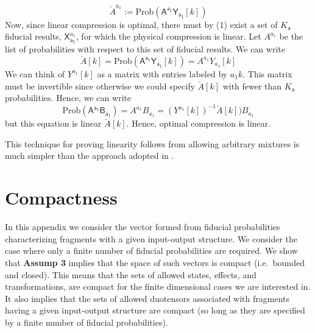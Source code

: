 \documentclass[10pt]{article}
\begin{document}
\begin{equation}
\breve{A}^{a_1}:= \text{Prob}(\mathsf{A^{a_1}}\mathsf{Y}_\mathsf{a_1}[k])
\end{equation}
Now, since linear compression is optimal, there must by (1) exist a set of $K_\mathsf{a}$ fiducial results, $\mathsf{X}_\mathsf{a_1}^{a_1}$, for which the physical compression is linear. Let $A^{a_1}$ be the list of probabilities with respect to this set of fiducial results.  We can write
\begin{equation}
\breve{A}[k]= \text{Prob}(\mathsf{A^{a_1}}\mathsf{Y}_\mathsf{a_1}[k])= A^{a_1}Y_{a_1}[k]
\end{equation}
We can think of $Y^{a_1}[k]$ as a matrix with entries labeled by $a_1 k$.   This matrix must be invertible since otherwise we could specify $\breve{A}[k]$ with fewer than $K_\mathsf{a}$ probabilities.  Hence, we can write
\begin{equation}
\text{Prob}(\mathsf{A^{a_1}B_{a_1}})=  A^{a_1}B_{a_1} =  (Y^{a_1}[k])^{-1} \breve{A}[k]) B_{a_1}
\end{equation}
but this equation is linear $\breve{A}[k]$.  Hence, optimal compression is linear.

This technique for proving linearity follows from allowing arbitrary mixtures is much simpler than the approach adopted in \cite{hardy2001quantum}.

\section{Compactness}\label{compactness}

In this appendix we consider the vector formed from fiducial probabilities characterizing fragments with a given input-output structure.  We consider the case where only a finite number of fiducial probabilities are required.  We show that {\bf Assump 3} implies that the space of such vectors is compact (i.e.\ bounded and closed).  This means that the sets of allowed states, effects, and transformations, are compact for the finite dimensional cases we are interested in.  It also implies that the sets of allowed duotensors associated with fragments having a given input-output structure are compact (so long as they are specified by a finite number of fiducial probabilities).
\end{document}
